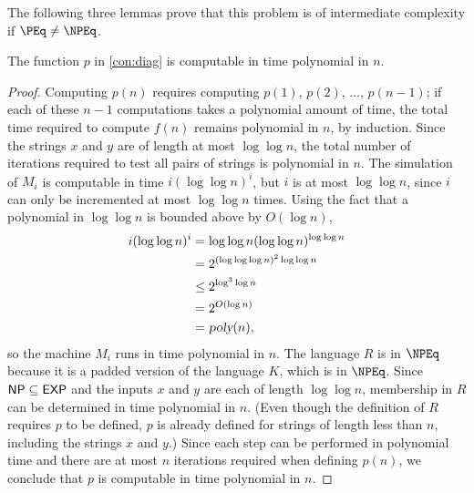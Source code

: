 The following three lemmas prove that this problem is of intermediate complexity if $\PEq \neq \NPEq$.

\begin{lemma}
  The function $p$ in \autoref{con:diag} is computable in time polynomial in $n$.
\end{lemma}
\begin{proof}
  Computing $p(n)$ requires computing $p(1)$, $p(2)$, $\dotsc$, $p(n - 1)$; if each of these $n - 1$ computations takes a polynomial amount of time, the total time required to compute $f(n)$ remains polynomial in $n$, by induction.
  Since the strings $x$ and $y$ are of length at most $\log \log n$, the total number of iterations required to test all pairs of strings is polynomial in $n$.
  The simulation of $M_i$ is computable in time $i (\log \log n)^i$, but $i$ is at most $\log \log n$, since $i$ can only be incremented at most $\log \log n$ times.
  Using the fact that a polynomial in $\log \log n$ is bounded above by $O(\log n)$,
  \begin{align*}
    i (\log \log n)^i & = \log \log n (\log \log n)^{\log \log n} \\
    & = 2^{(\log \log \log n)^2 \log \log n } \\
    & \leq 2^{\log^3 \log n} \\
    & = 2^{O(\log n)} \\
    & = {\textsl{poly}}(n),
  \end{align*}
  so the machine $M_i$ runs in time polynomial in $n$.
  The language $R$ is in $\NPEq$ because it is a padded version of the language $K$, which is in $\NPEq$.
  Since ${\mathsf{NP}} \subseteq {\ensuremath{\mathsf{EXP}}}$ and the inputs $x$ and $y$ are each of length $\log \log n$, membership in $R$ can be determined in time polynomial in $n$.
  (Even though the definition of $R$ requires $p$ to be defined, $p$ is already defined for strings of length less than $n$, including the strings $x$ and $y$.)
  Since each step can be performed in polynomial time and there are at most $n$ iterations required when defining $p(n)$, we conclude that $p$ is computable in time polynomial in $n$.
\end{proof}


